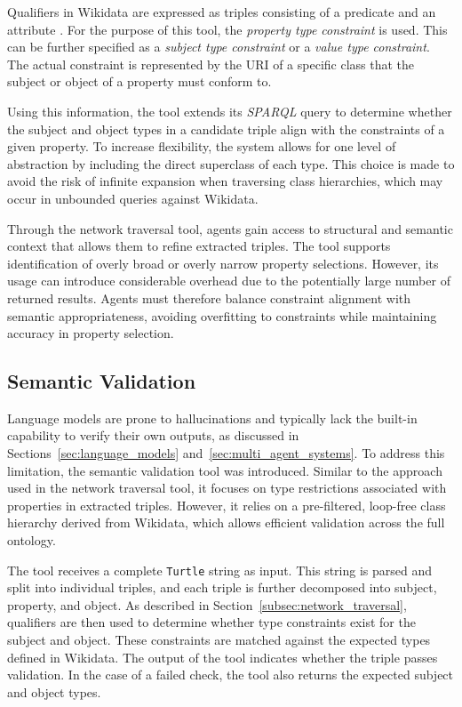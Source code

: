 \documentclass[a4paper,oneside,bibliography=totoc]{scrbook}
\begin{document}
Qualifiers in Wikidata are expressed as triples consisting of a predicate and an attribute \cite{Wikidata2025}. For the purpose of this tool, the \textit{property type constraint} is used. This can be further specified as a \textit{subject type constraint} or a \textit{value type constraint}. The actual constraint is represented by the URI of a specific class that the subject or object of a property must conform to.

Using this information, the tool extends its \textit{SPARQL} query to determine whether the subject and object types in a candidate triple align with the constraints of a given property. To increase flexibility, the system allows for one level of abstraction by including the direct superclass of each type. This choice is made to avoid the risk of infinite expansion when traversing class hierarchies, which may occur in unbounded queries against Wikidata.

Through the network traversal tool, agents gain access to structural and semantic context that allows them to refine extracted triples. The tool supports identification of overly broad or overly narrow property selections. However, its usage can introduce considerable overhead due to the potentially large number of returned results. Agents must therefore balance constraint alignment with semantic appropriateness, avoiding overfitting to constraints while maintaining accuracy in property selection.

\subsection{Semantic Validation}
\label{subsec:semantic_validation}

Language models are prone to hallucinations and typically lack the built-in capability to verify their own outputs, as discussed in Sections~\ref{sec:language_models} and~\ref{sec:multi_agent_systems}. To address this limitation, the semantic validation tool was introduced. Similar to the approach used in the network traversal tool, it focuses on type restrictions associated with properties in extracted triples. However, it relies on a pre-filtered, loop-free class hierarchy derived from Wikidata, which allows efficient validation across the full ontology.

The tool receives a complete \texttt{Turtle} string as input. This string is parsed and split into individual triples, and each triple is further decomposed into subject, property, and object. As described in Section~\ref{subsec:network_traversal}, qualifiers are then used to determine whether type constraints exist for the subject and object. These constraints are matched against the expected types defined in Wikidata. The output of the tool indicates whether the triple passes validation. In the case of a failed check, the tool also returns the expected subject and object types.
\end{document}
